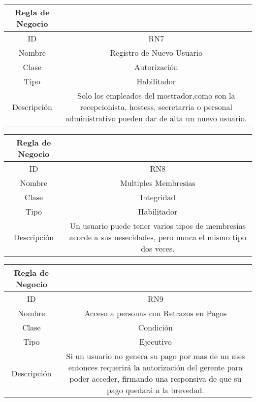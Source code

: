 \documentclass{article}
\begin{document}
\begin{center}
\begin{tabular}{ |c|c| } 
 \hline
 Regla de Negocio & \\
 \hline
 ID & RN7 \\ 
  \hline
  Nombre & Registro de Nuevo Usuario\\ 
  \hline
  Clase & Autorización\\ 
  \hline
  Tipo & Habilitador\\ 
  \hline
  Descripción & Solo los empleados del mostrador,como son la recepcionista, hostess, secretarria o personal administrativo pueden dar de alta un nuevo usuario.\\ 
   \hline
 \hline
\end{tabular}
\end{center}

\begin{center}
\begin{tabular}{ |c|c| } 
 \hline
 Regla de Negocio & \\
 \hline
 ID & RN8 \\ 
  \hline
  Nombre & Multiples Membresias\\ 
  \hline
  Clase & Integridad\\ 
  \hline
  Tipo & Habilitador\\ 
  \hline
  Descripción & Un usuario puede tener varios tipos de membresias acorde a sus nesecidades, pero nunca el mismo tipo dos veces.\\ 
   \hline
 \hline
\end{tabular}
\end{center}

\begin{center}
\begin{tabular}{ |c|c| } 
 \hline
 Regla de Negocio & \\
 \hline
 ID & RN9 \\ 
  \hline
  Nombre & Acceso a personas con Retrazos en Pagos\\ 
  \hline
  Clase & Condición\\ 
  \hline
  Tipo & Ejecutivo\\ 
  \hline
  Descripción & Si un usuario no genera su pago por mas de un mes entonces requerirá la autorización del gerente para poder acceder, firmando una responsiva de que su pago quedará a la brevedad.\\ 
   \hline
 \hline
\end{tabular}
\end{center}
\end{document}
